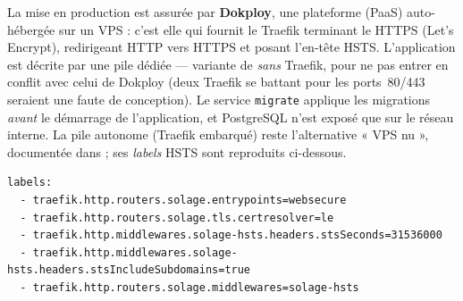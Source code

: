 La mise en production est assurée par \textbf{Dokploy}, une plateforme (PaaS) auto-hébergée sur un
VPS : c'est elle qui fournit le Traefik terminant le HTTPS (Let's Encrypt), redirigeant HTTP vers
HTTPS et posant l'en-tête HSTS. L'application est décrite par une pile dédiée
 --- variante de  \emph{sans}
Traefik, pour ne pas entrer en conflit avec celui de Dokploy (deux Traefik se battant pour les
ports~80/443 seraient une faute de conception). Le service \texttt{migrate} applique les migrations
\emph{avant} le démarrage de l'application, et PostgreSQL n'est exposé que sur le réseau interne.
La pile autonome  (Traefik embarqué) reste l'alternative « VPS nu »,
documentée dans  ; ses \emph{labels} HSTS sont reproduits ci-dessous.

\begin{lstlisting}[style=yaml, caption={Routage HTTPS et HSTS en production — \file{docker-compose.prod.yml}}]
labels:
  - traefik.http.routers.solage.entrypoints=websecure
  - traefik.http.routers.solage.tls.certresolver=le
  - traefik.http.middlewares.solage-hsts.headers.stsSeconds=31536000
  - traefik.http.middlewares.solage-hsts.headers.stsIncludeSubdomains=true
  - traefik.http.routers.solage.middlewares=solage-hsts
\end{lstlisting}

